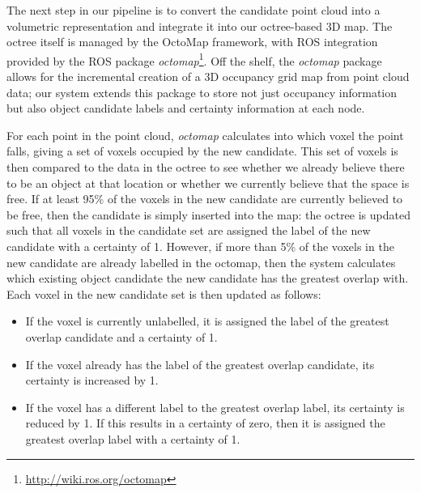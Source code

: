 The next step in our pipeline is to convert the candidate point cloud into a volumetric representation and integrate it into our octree-based 3D map.
The octree itself is managed by the OctoMap framework\cite{hornung13octomap}, with ROS integration provided by the ROS package \textit{octomap}\footnote{\url{http://wiki.ros.org/octomap}}.
Off the shelf, the \textit{octomap} package allows for the incremental creation of a 3D occupancy grid map from point cloud data; our system extends this package to store not just occupancy information but also object candidate labels and certainty information at each node.


For each point in the point cloud, \textit{octomap} calculates into which voxel the point falls, giving a set of voxels occupied by the new candidate.
This set of voxels is then compared to the data in the octree to see whether we already believe there to be an object at that location or whether we currently believe that the space is free.
If at least 95\% of the voxels in the new candidate are currently believed to be free, then the candidate is simply inserted into the map: the octree is updated such that all voxels in the candidate set are assigned the label of the new candidate with a certainty of 1.
However, if more than 5\% of the voxels in the new candidate are already labelled in the octomap, then the system calculates which existing object candidate the new candidate has the greatest overlap with.
Each voxel in the new candidate set is then updated as follows:

\begin{itemize}
	\item If the voxel is currently unlabelled, it is assigned the label of the greatest overlap candidate and a certainty of 1.
	\item If the voxel already has the label of the greatest overlap candidate, its certainty is increased by 1.
	\item If the voxel has a different label to the greatest overlap label, its certainty is reduced by 1. If this results in a certainty of zero, then it is assigned the greatest overlap label with a certainty of 1.
\end{itemize}
